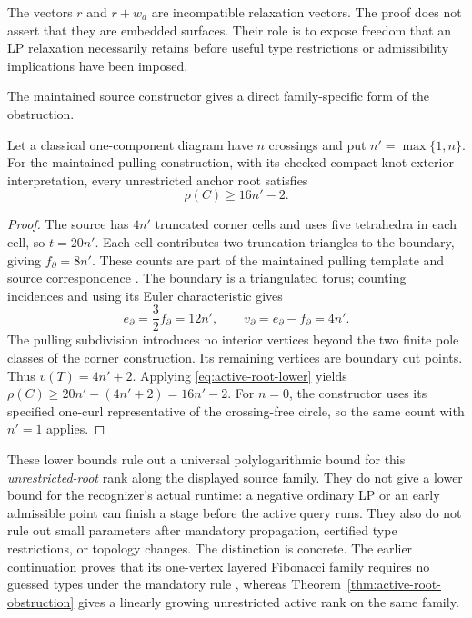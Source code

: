 The vectors $r$ and $r+w_a$ are incompatible relaxation vectors.  The proof
does not assert that they are embedded surfaces.  Their role is to expose
freedom that an LP relaxation necessarily retains before useful type
restrictions or admissibility implications have been imposed.

The maintained source constructor gives a direct family-specific form of
the obstruction.

\begin{corollary}
\label{cor:active-pulling-source}
Let a classical one-component diagram have $n$ crossings and put
$n'=\max\{1,n\}$.  For the maintained pulling construction, with its checked
compact knot-exterior interpretation, every unrestricted anchor root
satisfies
\begin{equation}\label{eq:active-source-linear}
 \rho(C)\ge16n'-2.
\end{equation}
\end{corollary}

\begin{proof}
The source has $4n'$ truncated corner cells and uses five tetrahedra in each
cell, so $t=20n'$.  Each cell contributes two truncation triangles to the
boundary, giving $f_\partial=8n'$.  These counts are part of the maintained
pulling template and source correspondence \cite{ProveItSource}.  The
boundary is a triangulated torus; counting incidences and using its Euler
characteristic gives
\[
 e_\partial=\frac32f_\partial=12n',\qquad
 v_\partial=e_\partial-f_\partial=4n'.
\]
The pulling subdivision introduces no interior vertices beyond the two
finite pole classes of the corner construction.  Its remaining vertices
are boundary cut points.  Thus $v(T)=4n'+2$.  Applying
\eqref{eq:active-root-lower} yields
$\rho(C)\ge20n'-(4n'+2)=16n'-2$.
For $n=0$, the constructor uses its specified one-curl representative of
the crossing-free circle, so the same count with $n'=1$ applies.
\end{proof}

These lower bounds rule out a universal polylogarithmic bound for this
\emph{unrestricted-root} rank along the displayed source family.  They do
not give a lower bound for the recognizer's actual runtime: a negative
ordinary LP or an early admissible point can finish a stage before the
active query runs.  They also do not rule out small parameters after
mandatory propagation, certified type restrictions, or topology changes.
The distinction is concrete.  The earlier continuation proves that its
one-vertex layered Fibonacci family requires no guessed types under the
mandatory rule \cite{priorDual}, whereas
Theorem~\ref{thm:active-root-obstruction} gives a linearly growing
unrestricted active rank on the same family.

